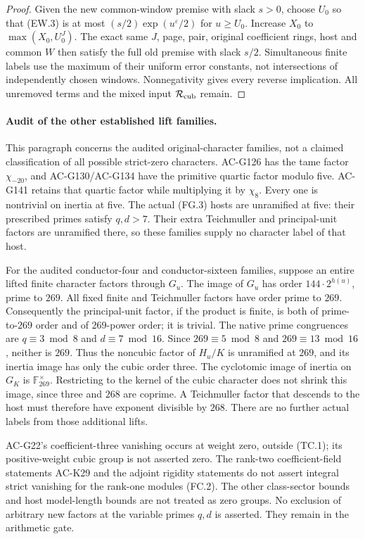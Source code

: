 \begin{proof}
Given the new common-window premise with slack $s>0$, choose
$U_0$ so that (EW.3) is at most
$(s/2)\exp(u^\varepsilon/2)$ for $u\geq U_0$.
Increase $X_0$ to $\max(X_0,U_0^J)$.
The exact same $J$, page, pair, original coefficient rings,
host and common $W$ then satisfy the full old premise with
slack $s/2$.  Simultaneous finite labels use the maximum of
their uniform error constants, not intersections of independently
chosen windows.  Nonnegativity gives every reverse implication.
All unremoved terms and the mixed input $\mathcal R_{\rm cub}$ remain.
\end{proof}

\paragraph{Audit of the other established lift families.}
This paragraph concerns the audited original-character families,
not a claimed classification of all possible strict-zero characters.
AC-G126 has the tame factor $\chi_{-20}$, and AC-G130/AC-G134
have the primitive quartic factor modulo five.
AC-G141 retains that quartic factor while multiplying it by $\chi_8$.
Every one is nontrivial on inertia at five.
The actual (FG.3) hosts are unramified at five: their prescribed
primes satisfy $q,d>7$.
Their extra Teichmuller and principal-unit factors are unramified
there, so these families supply no character label of that host.

For the audited conductor-four and conductor-sixteen families,
suppose an entire lifted finite character factors through $G_u$.
The image of $G_u$ has order $144\cdot2^{h(u)}$, prime to $269$.
All fixed finite and Teichmuller factors have order prime to $269$.
Consequently the principal-unit factor, if the product is finite,
is both of prime-to-$269$ order and of $269$-power order; it is trivial.
The native prime congruences are $q\equiv3\bmod8$ and $d\equiv7\bmod16$.
Since $269\equiv5\bmod8$ and $269\equiv13\bmod16$, neither is $269$.
Thus the noncubic factor of $H_u/K$ is unramified at $269$,
and its inertia image has only the cubic order three.
The cyclotomic image of inertia on $G_K$ is $\mathbb F_{269}^\times$.
Restricting to the kernel of the cubic character does not shrink
this image, since three and $268$ are coprime.
A Teichmuller factor that descends to the host must therefore have
exponent divisible by $268$.
There are no further actual labels from those additional lifts.

AC-G22's coefficient-three vanishing occurs at weight zero,
outside (TC.1); its positive-weight cubic group is not asserted zero.
The rank-two coefficient-field statements AC-K29 and the adjoint
rigidity statements do not assert integral strict vanishing for
the rank-one modules (FC.2).
The other class-sector bounds and host model-length bounds are
not treated as zero groups.
No exclusion of arbitrary new factors at the variable primes $q,d$
is asserted.  They remain in the arithmetic gate.

